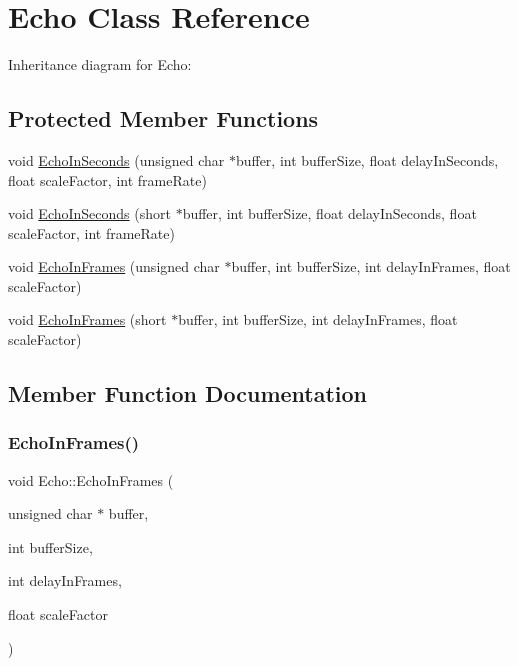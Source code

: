 \hypertarget{classEcho}{}\section{Echo Class Reference}
\label{classEcho}


Inheritance diagram for Echo\+:
\subsection*{Protected Member Functions}
\begin{DoxyCompactItemize}
\item 
void \hyperlink{classEcho_ac33fbb5ee26f0b39b76657def1eec631}{Echo\+In\+Seconds} (unsigned char $\ast$buffer, int buffer\+Size, float delay\+In\+Seconds, float scale\+Factor, int frame\+Rate)
\item 
void \hyperlink{classEcho_a3e3b5040afb0ea01c72d3dbd7f49a879}{Echo\+In\+Seconds} (short $\ast$buffer, int buffer\+Size, float delay\+In\+Seconds, float scale\+Factor, int frame\+Rate)
\item 
void \hyperlink{classEcho_ab184be947177fcf79cac7b1faf959f3f}{Echo\+In\+Frames} (unsigned char $\ast$buffer, int buffer\+Size, int delay\+In\+Frames, float scale\+Factor)
\item 
void \hyperlink{classEcho_af96c36f5ed41c06cca8a7147c43c7000}{Echo\+In\+Frames} (short $\ast$buffer, int buffer\+Size, int delay\+In\+Frames, float scale\+Factor)
\end{DoxyCompactItemize}


\subsection{Member Function Documentation}
\mbox{\label{classEcho_ab184be947177fcf79cac7b1faf959f3f}} 
\subsubsection{\texorpdfstring{Echo\+In\+Frames()}{EchoInFrames()}\hspace{0.1cm}{\footnotesize\ttfamily [1/2]}}
{\footnotesize\ttfamily void Echo\+::\+Echo\+In\+Frames (\begin{DoxyParamCaption}\item[{unsigned char $\ast$}]{buffer,  }\item[{int}]{buffer\+Size,  }\item[{int}]{delay\+In\+Frames,  }\item[{float}]{scale\+Factor }\end{DoxyParamCaption})\hspace{0.3cm}{\ttfamily [protected]}}

